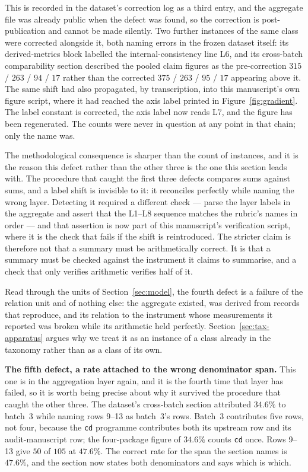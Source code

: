 \documentclass[sigconf,review]{acmart}
\newcommand{\pkg}[1]{\texttt{#1}}
\begin{document}
This is recorded in the dataset's correction log as a third entry, and the
aggregate file was already public when the defect was found, so the correction
is post-publication and cannot be made silently. Two further instances of the
same class were corrected alongside it, both naming errors in the frozen
dataset itself: its derived-metrics block labelled the internal-consistency
line L6, and its cross-batch comparability section described the pooled claim
figures as the pre-correction $315$ / $263$ / $94$ / $17$ rather than the
corrected $375$ / $263$ / $95$ / $17$ appearing above it. The same shift had
also propagated, by transcription, into this manuscript's own figure script,
where it had reached the axis label printed in
Figure~\ref{fig:gradient}. The label constant is corrected, the axis label now
reads L7, and the figure has been regenerated. The counts were never in
question at any point in that chain; only the name was.

The methodological consequence is sharper than the count of instances, and it
is the reason this defect rather than the other three is the one this section
leads with. The procedure that caught the first three defects compares sums
against sums, and a label shift is invisible to it: it reconciles perfectly
while naming the wrong layer. Detecting it required a different check --- parse
the layer labels in the aggregate and assert that the L1--L8 sequence matches
the rubric's names in order --- and that assertion is now part of this
manuscript's verification script, where it is the check that fails if the
shift is reintroduced. The stricter claim is therefore not that a summary must
be arithmetically correct. It is that a summary must be checked against the
instrument it claims to summarise, and a check that only verifies arithmetic
verifies half of it.

Read through the units of Section~\ref{sec:model}, the fourth defect is a
failure of the relation unit and of nothing else: the aggregate existed, was
derived from records that reproduce, and its relation to the instrument whose
measurements it reported was broken while its arithmetic held perfectly.
Section~\ref{sec:tax-apparatus} argues why we treat it as an instance of a
class already in the taxonomy rather than as a class of its own.

\textbf{The fifth defect, a rate attached to the wrong denominator span.}
This one is in the aggregation layer again, and it is the fourth time that
layer has failed, so it is worth being precise about why it survived the
procedure that caught the other three. The dataset's cross-batch section
attributed $34.6\%$ to batch~3 while naming rows 9--13 as batch~3's rows.
Batch~3 contributes five rows, not four, because the \pkg{cd} programme
contributes both its upstream row and its audit-manuscript row; the
four-package figure of $34.6\%$ counts \pkg{cd} once. Rows 9--13 give $50$ of
$105$ at $47.6\%$. The correct rate for the span the section names is
$47.6\%$, and the section now states both denominators and says which is which.
\end{document}
